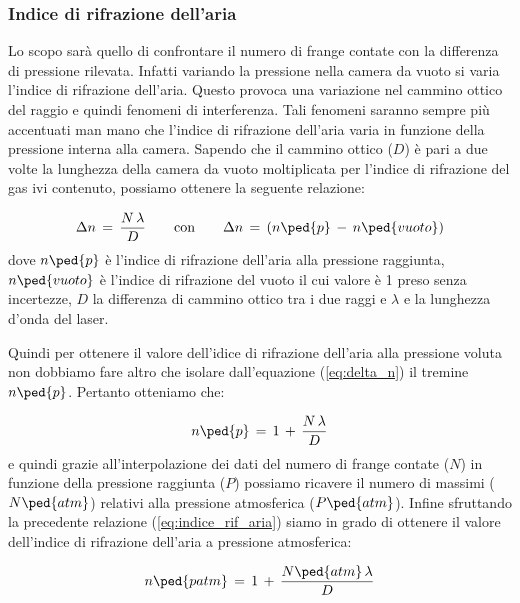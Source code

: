 \subsubsection{Indice di rifrazione dell'aria} %

Lo scopo sarà quello di confrontare il numero di frange contate con la differenza di pressione rilevata.
Infatti variando la pressione nella camera da vuoto si varia l'indice di rifrazione dell'aria.
Questo provoca una variazione nel cammino ottico del raggio  e quindi fenomeni di interferenza.
Tali fenomeni saranno sempre più accentuati man mano che l'indice di rifrazione dell'aria varia in funzione della pressione interna alla camera.
Sapendo che il cammino ottico ($D$) è pari a due volte la lunghezza della camera da vuoto moltiplicata per l'indice di rifrazione del gas ivi contenuto, possiamo ottenere la seguente relazione:

\begin{equation}
	\Delta{n} \,=\, \frac{N \, \lambda}{D} \qquad \text{con} \qquad \Delta{n} \,=\, (n\ped{p} \,-\, n\ped{vuoto})
	\label{eq:delta_n}
\end{equation}
%
dove $n\ped{p}$ è l'indice di rifrazione dell'aria alla pressione raggiunta, $n\ped{vuoto}$ è l'indice di rifrazione del vuoto il cui valore è 1 preso senza incertezze, $D$ la differenza di cammino ottico tra i due raggi e $\lambda$ e la lunghezza d'onda del laser.

Quindi per ottenere il valore dell'idice di rifrazione dell'aria alla pressione voluta non dobbiamo fare altro che isolare dall'equazione (\ref{eq:delta_n}) il tremine $n\ped{p}$. Pertanto otteniamo che:

\begin{equation}
	n\ped{p} \,=\, 1 \,+\, \frac{N \, \lambda}{D}
	\label{eq:indice_rif_aria}
\end{equation}
%
e quindi grazie all'interpolazione dei dati del numero di frange contate ($N$) in funzione della pressione raggiunta ($P$) possiamo ricavere il numero di massimi ($N\ped{atm}$) relativi alla pressione atmosferica ($P\ped{atm}$).
Infine sfruttando la precedente relazione (\ref{eq:indice_rif_aria}) siamo in grado di ottenere il valore dell'indice di rifrazione dell'aria a pressione atmosferica:

\begin{equation}
	n\ped{patm} \,=\, 1 \,+\, \frac{N\ped{atm} \, \lambda}{D}
	\label{eq:indice_rif_aria_atm}
\end{equation}
%

